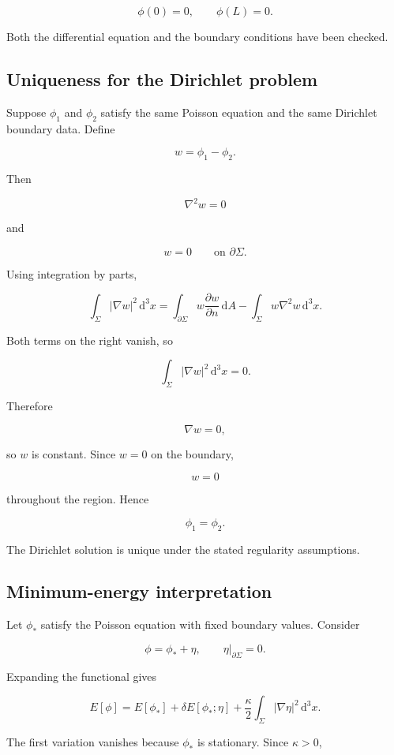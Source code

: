 \[
\phi(0)=0,
\qquad
\phi(L)=0.
\]

Both the differential equation and the boundary conditions have been checked.

\subsection{Uniqueness for the Dirichlet problem}

Suppose \(\phi_{1}\) and \(\phi_{2}\) satisfy the same Poisson equation and the same Dirichlet boundary data. Define

\[
w=\phi_{1}-\phi_{2}.
\]

Then

\[
\nabla^{2}w=0
\]

and

\[
w=0
\qquad
\text{on }\partial\Sigma.
\]

Using integration by parts,

\[
\int_{\Sigma}
|\nabla w|^{2}
\,\mathrm{d}^{3}x
=
\int_{\partial\Sigma}
w\frac{\partial w}{\partial n}
\,\mathrm{d}A
-
\int_{\Sigma}
w\nabla^{2}w
\,\mathrm{d}^{3}x.
\]

Both terms on the right vanish, so

\[
\int_{\Sigma}|\nabla w|^{2}\,\mathrm{d}^{3}x=0.
\]

Therefore

\[
\nabla w=0,
\]

so \(w\) is constant. Since \(w=0\) on the boundary,

\[
w=0
\]

throughout the region. Hence

\[
\boxed{
\phi_{1}=\phi_{2}
}.
\]

The Dirichlet solution is unique under the stated regularity assumptions.

\subsection{Minimum-energy interpretation}

Let \(\phi_{*}\) satisfy the Poisson equation with fixed boundary values. Consider

\[
\phi=\phi_{*}+\eta,
\qquad
\eta|_{\partial\Sigma}=0.
\]

Expanding the functional gives

\[
E[\phi]
=
E[\phi_{*}]
+
\delta E[\phi_{*};\eta]
+
\frac{\kappa}{2}
\int_{\Sigma}
|\nabla\eta|^{2}
\,\mathrm{d}^{3}x.
\]

The first variation vanishes because \(\phi_{*}\) is stationary. Since \(\kappa>0\),

